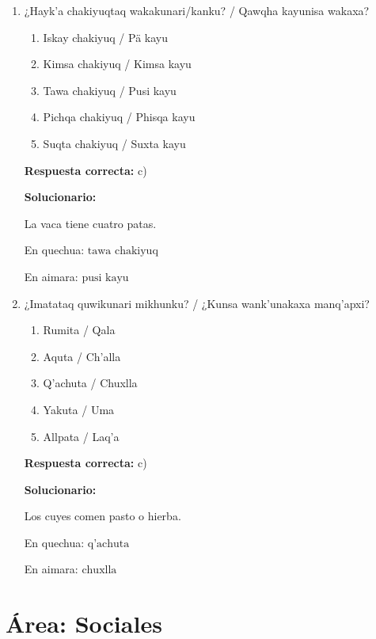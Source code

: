 \begin{enumerate}[resume]

	
	\item ¿Hayk'a chakiyuqtaq wakakunari/kanku? / Qawqha kayunisa wakaxa?
	\begin{enumerate}[label=\alph*)]
		\item Iskay chakiyuq / Pä kayu
		\item Kimsa chakiyuq / Kimsa kayu
		\item Tawa chakiyuq / Pusi kayu
		\item Pichqa chakiyuq / Phisqa kayu
		\item Suqta chakiyuq / Suxta kayu
	\end{enumerate}
	\textbf{Respuesta correcta:} c)
	
	\vspace{2mm}
	\textbf{Solucionario:}
	
	La vaca tiene cuatro patas.
	
	En quechua:
	$ \text{tawa chakiyuq} $
	
	En aimara:
	$ \text{pusi kayu} $
	
	\vspace{6mm}
	
	\item ¿Imatataq quwikunari mikhunku? / ¿Kunsa wank'unakaxa manq'apxi?
	\begin{enumerate}[label=\alph*)]
		\item Rumita / Qala
		\item Aquta / Ch'alla
		\item Q'achuta / Chuxlla
		\item Yakuta / Uma
		\item Allpata / Laq'a
	\end{enumerate}
	\textbf{Respuesta correcta:} c)
	
	\vspace{2mm}
	\textbf{Solucionario:}
	
	Los cuyes comen pasto o hierba.
	
	En quechua:
	$ \text{q'achuta} $
	
	En aimara:
	$ \text{chuxlla} $
	
	\vspace{6mm}
	
\end{enumerate}




\section*{Área: Sociales}

